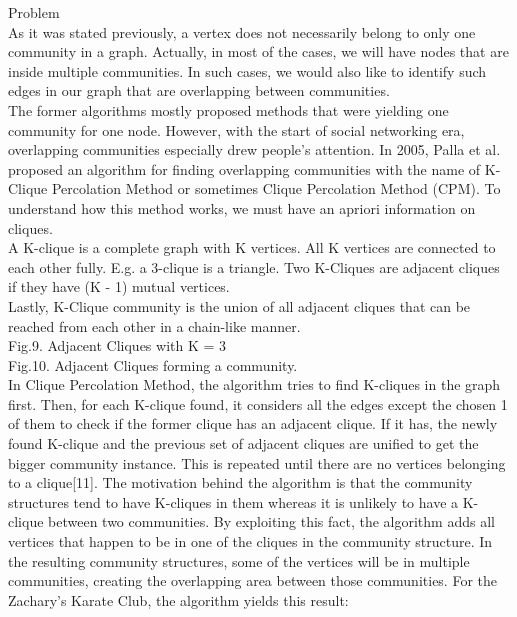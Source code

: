 \documentclass[10pt]{article}
\begin{document}
Problem \\

As it was stated previously, a vertex does not necessarily belong to only one community in a graph. Actually, in most of the cases, we will have nodes that are inside multiple communities. In such cases, we would also like to identify such edges in our graph that are overlapping between communities. \\

The former algorithms mostly proposed methods that were yielding one community for one node. However, with the start of social networking era, overlapping communities especially drew people’s attention. In 2005, Palla et al. proposed an algorithm for finding overlapping communities with the name of K-Clique Percolation Method or sometimes Clique Percolation Method (CPM). To understand how this method works, we must have an apriori information on cliques. \\

A K-clique is a complete graph with K vertices. All K vertices are connected to each other fully. E.g. a 3-clique is a triangle.
Two K-Cliques are adjacent cliques if they have (K - 1) mutual vertices. \\

Lastly, K-Clique community is the union of all adjacent cliques that can be reached from each other in a chain-like manner. \\

Fig.9. Adjacent Cliques with K = 3 \\

Fig.10. Adjacent Cliques forming a community. \\

In Clique Percolation Method, the algorithm tries to find K-cliques in the graph first. Then, for each K-clique found, it considers all the edges except the chosen 1 of them to check if the former clique has an adjacent clique. If it has, the newly found K-clique and the previous set of adjacent cliques are unified to get the bigger community instance. This is repeated until there are no vertices belonging to a clique[11].
The motivation behind the algorithm is that the community structures tend to have K-cliques in them whereas it is unlikely to have a K-clique between two communities. By exploiting this fact, the algorithm adds all vertices that happen to be in one of the cliques in the community structure. In the resulting community structures, some of the vertices will be in multiple communities, creating the overlapping area between those communities. For the Zachary’s Karate Club, the algorithm yields this result: \\
\end{document}
